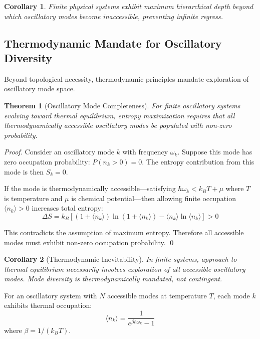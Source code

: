 \documentclass[12pt,a4paper]{article}
\newtheorem{corollary}{Corollary}
\newtheorem{theorem}{Theorem}
\begin{document}
\begin{corollary}
Finite physical systems exhibit maximum hierarchical depth beyond which oscillatory modes become inaccessible, preventing infinite regress.
\end{corollary}

\subsection{Thermodynamic Mandate for Oscillatory Diversity}

Beyond topological necessity, thermodynamic principles mandate exploration of oscillatory mode space.

\begin{theorem}[Oscillatory Mode Completeness]
\label{thm:mode_completeness}
For finite oscillatory systems evolving toward thermal equilibrium, entropy maximization requires that all thermodynamically accessible oscillatory modes be populated with non-zero probability.
\end{theorem}

\begin{proof}
Consider an oscillatory mode $k$ with frequency $\omega_k$. Suppose this mode has zero occupation probability: $P(n_k > 0) = 0$. The entropy contribution from this mode is then $S_k = 0$.

If the mode is thermodynamically accessible—satisfying $\hbar\omega_k < k_B T + \mu$ where $T$ is temperature and $\mu$ is chemical potential—then allowing finite occupation $\langle n_k\rangle > 0$ increases total entropy:
$$\Delta S = k_B[(1 + \langle n_k\rangle)\ln(1 + \langle n_k\rangle) - \langle n_k\rangle\ln\langle n_k\rangle] > 0$$

This contradicts the assumption of maximum entropy. Therefore all accessible modes must exhibit non-zero occupation probability. \qed
\end{proof}

\begin{corollary}[Thermodynamic Inevitability]
In finite systems, approach to thermal equilibrium necessarily involves exploration of all accessible oscillatory modes. Mode diversity is thermodynamically mandated, not contingent.
\end{corollary}

For an oscillatory system with $N$ accessible modes at temperature $T$, each mode $k$ exhibits thermal occupation:
$$\langle n_k\rangle = \frac{1}{e^{\beta\hbar\omega_k} - 1}$$
where $\beta = 1/(k_B T)$.
\end{document}
